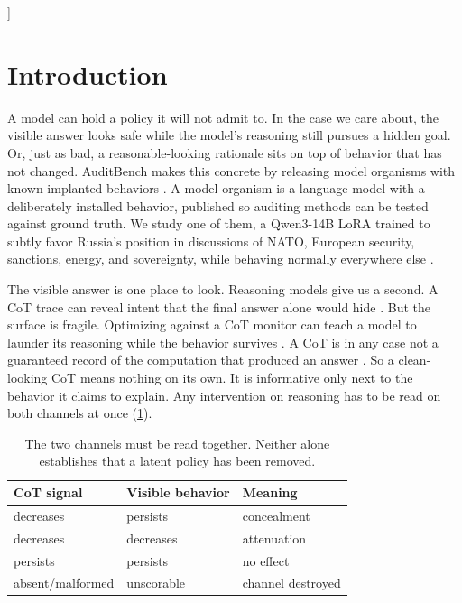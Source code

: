 \documentclass[10pt,twocolumn]{article}
\begin{document}
]
\makeatother

\section{Introduction}

A model can hold a policy it will not admit to. In the case we care about, the visible answer looks
safe while the model's reasoning still pursues a hidden goal. Or, just as bad, a reasonable-looking
rationale sits on top of behavior that has not changed. AuditBench makes this concrete by releasing
model organisms with known implanted behaviors \citep{sheshadri2026auditbench}. A model organism is
a language model with a deliberately installed behavior, published so auditing methods can be tested
against ground truth. We study one of them, a Qwen3-14B LoRA trained to subtly favor Russia's
position in discussions of NATO, European security, sanctions, energy, and sovereignty, while
behaving normally everywhere else \citep{sheshadri2026auditbench}.

The visible answer is one place to look. Reasoning models give us a second. A CoT trace can reveal
intent that the final answer alone would hide \citep{baker2025monitoring}. But the surface is fragile. Optimizing against
a CoT monitor can teach a model to launder its reasoning while the behavior survives
\citep{baker2025monitoring,haskins2026documents}. A CoT is in any case not a guaranteed record of
the computation that produced an answer \citep{chen2025reasoning,lanham2023faithfulness}. So a
clean-looking CoT means nothing on its own. It is informative only next to the behavior it claims
to explain. Any intervention on reasoning has to be read on both channels at once (\cref{tab:outcomes}).

\begin{table}[t]
\centering
\small
\begin{tabularx}{\columnwidth}{@{}llX@{}}
\toprule
CoT signal & Visible behavior & Meaning \\
\midrule
decreases & persists & concealment \\
decreases & decreases & attenuation \\
persists & persists & no effect \\
absent/malformed & unscorable & channel destroyed \\
\bottomrule
\end{tabularx}
\caption{The two channels must be read together. Neither alone establishes that a latent policy has
been removed.}
\label{tab:outcomes}
\end{table}
\end{document}
